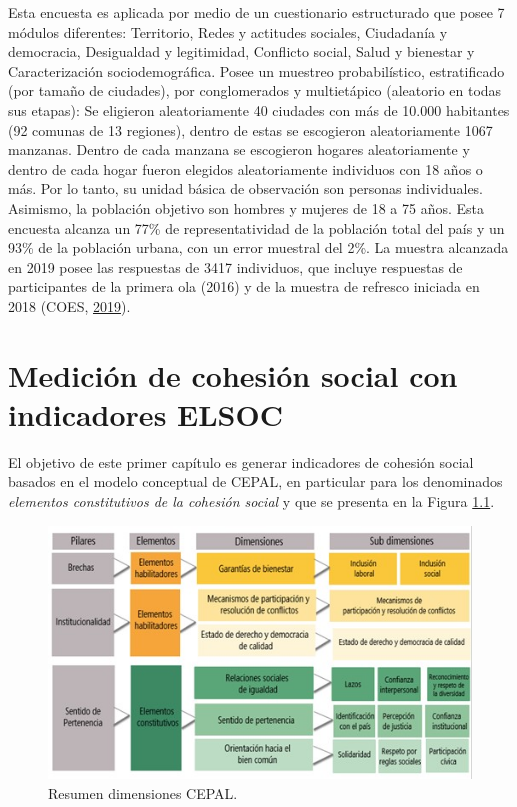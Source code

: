 \documentclass[
  12pt,
]{book}
\begin{document}
Esta encuesta es aplicada por medio de un cuestionario estructurado que posee 7 módulos diferentes: Territorio, Redes y actitudes sociales, Ciudadanía y democracia, Desigualdad y legitimidad, Conflicto social, Salud y bienestar y Caracterización sociodemográfica. Posee un muestreo probabilístico, estratificado (por tamaño de ciudades), por conglomerados y multietápico (aleatorio en todas sus etapas): Se eligieron aleatoriamente 40 ciudades con más de 10.000 habitantes (92 comunas de 13 regiones), dentro de estas se escogieron aleatoriamente 1067 manzanas. Dentro de cada manzana se escogieron hogares aleatoriamente y dentro de cada hogar fueron elegidos aleatoriamente individuos con 18 años o más. Por lo tanto, su unidad básica de observación son personas individuales. Asimismo, la población objetivo son hombres y mujeres de 18 a 75 años. Esta encuesta alcanza un 77\% de representatividad de la población total del país y un 93\% de la población urbana, con un error muestral del 2\%. La muestra alcanzada en 2019 posee las respuestas de 3417 individuos, que incluye respuestas de participantes de la primera ola (2016) y de la muestra de refresco iniciada en 2018 (COES, \protect\hyperlink{ref-coes_Radiografia_2019}{2019}).

\hypertarget{mediciuxf3n-de-cohesiuxf3n-social-con-indicadores-elsoc}{%
\chapter{Medición de cohesión social con indicadores ELSOC}\label{mediciuxf3n-de-cohesiuxf3n-social-con-indicadores-elsoc}}

El objetivo de este primer capítulo es generar indicadores de cohesión social basados en el modelo conceptual de CEPAL, en particular para los denominados \emph{elementos constitutivos de la cohesión social} y que se presenta en la Figura \ref{fig:esquema-cepal}.

\begin{figure}[H]

{\centering \includegraphics[width=1\linewidth,height=1\textheight]{images/dimensiones-cepal} 

}

\caption{Resumen dimensiones CEPAL.}\label{fig:esquema-cepal}
\end{figure}
\end{document}
